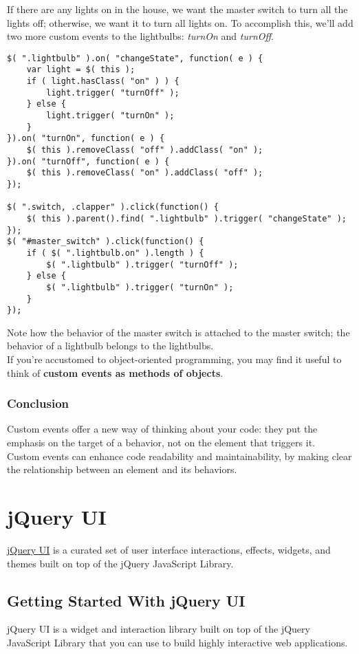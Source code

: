 \documentclass[10pt,letterpaper]{report}
\begin{document}
If there are any lights on in the house, we want the master switch to turn all the lights off; otherwise, we want it to turn all lights on. To accomplish this, we'll add two more custom events to the lightbulbs: \textit{turnOn} and \textit{turnOff}.
\lstset{language=JavaScript} 
\begin{lstlisting}
$( ".lightbulb" ).on( "changeState", function( e ) {
	var light = $( this );
	if ( light.hasClass( "on" ) ) {
		light.trigger( "turnOff" );
	} else {
		light.trigger( "turnOn" );
	}
}).on( "turnOn", function( e ) {
	$( this ).removeClass( "off" ).addClass( "on" );
}).on( "turnOff", function( e ) {
	$( this ).removeClass( "on" ).addClass( "off" );
});

$( ".switch, .clapper" ).click(function() {
	$( this ).parent().find( ".lightbulb" ).trigger( "changeState" );
});
$( "#master_switch" ).click(function() {
	if ( $( ".lightbulb.on" ).length ) {
		$( ".lightbulb" ).trigger( "turnOff" );
	} else {
		$( ".lightbulb" ).trigger( "turnOn" );
	}
});
\end{lstlisting}
Note how the behavior of the master switch is attached to the master switch; the behavior of a lightbulb belongs to the lightbulbs.\\
If you're accustomed to object-oriented programming, you may find it useful to think of \textbf{custom events as methods of objects}.
\subsection{Conclusion}
Custom events offer a new way of thinking about your code: they put the emphasis on the target of a behavior, not on the element that triggers it.\\  Custom events can enhance code readability and maintainability, by making clear the relationship between an element and its behaviors.
\chapter{jQuery UI}
\href{http://jqueryui.com/}{jQuery UI} is a curated set of user interface interactions, effects, widgets, and themes built on top of the jQuery JavaScript Library.\\
\section{Getting Started With jQuery UI}
jQuery UI is a widget and interaction library built on top of the jQuery JavaScript Library that you can use to build highly interactive web applications.
\end{document}
